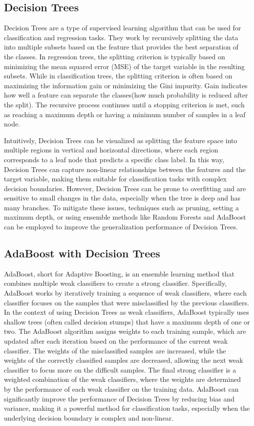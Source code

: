 \documentclass{article}
\begin{document}
\subsection{Decision Trees}
Decision Trees are a type of supervised learning algorithm that can be used for classification and regression tasks. 
They work by recursively splitting the data into multiple subsets based on the feature that provides the best separation of the classes.
In regression trees, the splitting criterion is typically based on minimizing the mean squared error (MSE) of the target variable in the resulting subsets.
While in classification trees, the splitting criterion is often based on maximizing the information gain or minimizing the Gini impurity.
Gain indicates how well a feature can separate the classes(how much probability is reduced after the split).
The recursive process continues until a stopping criterion is met, such as reaching a maximum depth or having a minimum number of samples in a leaf node.

Intuitively, Decision Trees can be visualized as splitting the feature space into multiple regions in vertical and horizontal directions, where each region corresponds to a leaf node that predicts a specific class label.
In this way, Decision Trees can capture non-linear relationships between the features and the target variable, making them suitable for classification tasks with complex decision boundaries.
However, Decision Trees can be prone to overfitting and are sensitive to small changes in the data, especially when the tree is deep and has many branches.
To mitigate these issues, techniques such as pruning, setting a maximum depth, or using ensemble methods like Random Forests and AdaBoost can be employed to improve the generalization performance of Decision Trees.

\subsection{AdaBoost with Decision Trees}
AdaBoost, short for Adaptive Boosting, is an ensemble learning method that combines multiple weak classifiers to create a strong classifier.
Specifically, AdaBoost works by iteratively training a sequence of weak classifiers, where each classifier focuses on the samples that were misclassified by the previous classifiers.
In the context of using Decision Trees as weak classifiers, AdaBoost typically uses shallow trees (often called decision stumps) that have a maximum depth of one or two.
The AdaBoost algorithm assigns weights to each training sample, which are updated after each iteration based on the performance of the current weak classifier.
The weights of the misclassified samples are increased, while the weights of the correctly classified samples are decreased, allowing the next weak classifier to focus more on the difficult samples.
The final strong classifier is a weighted combination of the weak classifiers, where the weights are determined by the performance of each weak classifier on the training data.
AdaBoost can significantly improve the performance of Decision Trees by reducing bias and variance, making it a powerful method for classification tasks, especially when the underlying decision boundary is complex and non-linear.
\end{document}
